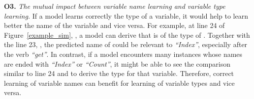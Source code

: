 %
%



\textbf{O3.} {\em The mutual impact between variable name learning and
  variable type learning.} If a model learns correctly the type of a
variable, it would help to learn better the name of the variable and
vice versa. For example, at line 24 of Figure~\ref{example_sim},
, a model can derive that  is of the type
of . Together with the line 23, , the predicted name
of  could be relevant to {\em ``Index''}, especially after the
verb {\em ``get''}. In contrast, if a model encounters many instances
whose names are ended with {\em ``Index''} or {\em ``Count''}, it might
be able to see the comparison similar to line 24 and to derive
the type  for that variable. Therefore,
correct learning of variable names can benefit for learning of
variable types and vice versa.








